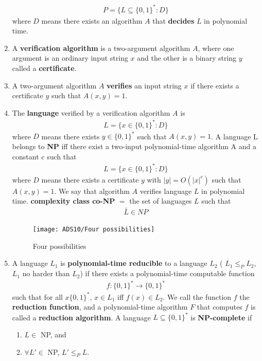 \begin{enumerate}
    \begin{align*}
        P = \{ L \subseteq \{0, 1\}^* : D \}
    \end{align*}
    where $D$ means there exists an algorithm $A$ that \textbf{decides} $L$ in polynomial time. 
    \item A \textbf{verification algorithm} is a two-argument algorithm $A$, where one argument is an ordinary input string $x$ and the other is a binary string  $y$ called a \textbf{certificate}. 
    \item A two-argument algorithm $A$ \textbf{verifies} an input string $x$ if there exists a certificate $y$ such that $A(x, y) = 1$. 
    \item The \textbf{language} verified by a verification algorithm $A$ is 
    \begin{align*}
        L = \{ x \in \{0, 1\}^* : D\}
    \end{align*}
    where $D$ means there exists $y \in \{0, 1\}^*$ such that $A(x, y) = 1$.
    \subitem A language L belongs to \textbf{NP} iff there exist a two-input polynomial-time algorithm A and a constant c such that 
    \begin{align*}
        L = \{ x \in \{0, 1\}^* : D\}
    \end{align*}
    where $D$ means there exists a certificate $y$ with $|y| = O(|x|^c)$ such that $A(x, y) = 1$. We say that algorithm \textcolor{light_red}{$A$ verifies language $L$ in polynomial time}.
    \subitem \textbf{complexity class co-NP} $=$ the set of languages $L$ such that
    \begin{align*}
        \bar{L} \in NP
    \end{align*}

    \begin{figure}[H]
        \centering
        \texttt{[image: ADS10/Four possibilities]}
        \caption{Four possibilities}
    \end{figure}

    \item A language $L_1$ is \textbf{polynomial-time reducible} to a language $L_2$ ( $L_1 \le_P L_2$, $L_1$ no harder than $L_2$) if there exists a polynomial-time computable function  
    \begin{align*}
        f : \{0, 1\}^* \rightarrow \{0,1\}^*
    \end{align*} 
    such that for all $x \{0, 1\}^*$,  $x \in L_1$  iff  $f (x) \in L_2$. We call the function $f$ the \textbf{reduction function}, and a polynomial-time algorithm $F$ that computes $f$  is called a \textbf{reduction algorithm}.
    \subitem A language $L \subseteq \{0, 1\}^*$ is \textbf{NP-complete} if
    \begin{enumerate}
        \item $L \in$ NP, and
        \item $\forall L' \in $ NP, $L' \le_P L$.
    \end{enumerate}    
\end{enumerate}